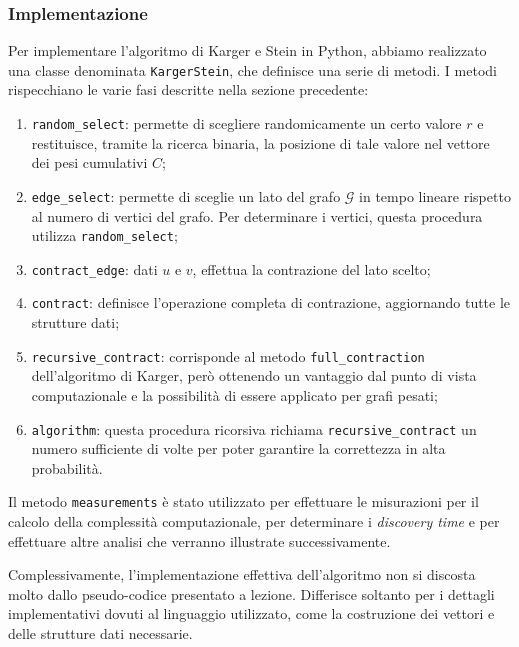 \subsubsection{Implementazione}
Per implementare l'algoritmo di Karger e Stein in Python, abbiamo realizzato una classe 
denominata \verb|KargerStein|, che definisce una serie di metodi. I metodi rispecchiano 
le varie fasi descritte nella sezione precedente:
\begin{enumerate}
    \item \verb|random_select|: permette di scegliere randomicamente un certo valore 
    $r$ e restituisce, tramite la ricerca binaria, la posizione di tale valore nel 
    vettore dei pesi cumulativi $C$;
    \item \verb|edge_select|: permette di sceglie un lato del grafo $\mathcal{G}$ in 
    tempo lineare rispetto al numero di vertici del grafo. Per determinare i vertici, 
    questa procedura utilizza \verb|random_select|;
    \item \verb|contract_edge|: dati $u$ e $v$, effettua la contrazione del lato scelto;
    \item \verb|contract|: definisce l'operazione completa di contrazione, aggiornando 
    tutte le strutture dati;
    \item \verb|recursive_contract|: corrisponde al metodo \verb|full_contraction| 
    dell'algoritmo di Karger, però ottenendo un vantaggio dal punto di vista 
    computazionale e la possibilità di essere applicato per grafi pesati;
    \item \verb|algorithm|: questa procedura ricorsiva richiama
    \verb|recursive_contract| un numero sufficiente di volte per poter garantire la 
    correttezza in alta probabilità.
\end{enumerate}

Il metodo \verb|measurements| è stato utilizzato per effettuare le misurazioni per il 
calcolo della complessità computazionale, per determinare i \textit{discovery time} e 
per effettuare altre analisi che verranno illustrate successivamente.

Complessivamente, l'implementazione effettiva dell'algoritmo non si discosta molto 
dallo pseudo-codice presentato a lezione. Differisce soltanto per i dettagli 
implementativi dovuti al linguaggio utilizzato, come la costruzione dei vettori e 
delle strutture dati necessarie.

